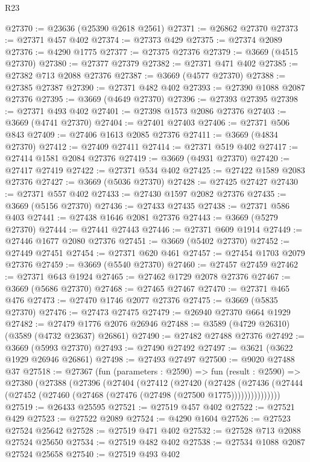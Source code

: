 \begin{lexlean}{R23}
\begin{coremodule}
@27370 := @23636 (@25390 @2618 @2561)
@27371 := @26862 @27370
@27373 := @27371 @457 @402
@27374 := @27373 @429
@27375 := @27374 @2089
@27376 := @4290 @1775
@27377 := @27375 @27376
@27379 := @3669 (@4515 @27370)
@27380 := @27377 @27379
@27382 := @27371 @471 @402
@27385 := @27382 @713 @2088 @27376
@27387 := @3669 (@4577 @27370)
@27388 := @27385 @27387
@27390 := @27371 @482 @402
@27393 := @27390 @1088 @2087 @27376
@27395 := @3669 (@4649 @27370)
@27396 := @27393 @27395
@27398 := @27371 @493 @402
@27401 := @27398 @1573 @2086 @27376
@27403 := @3669 (@4741 @27370)
@27404 := @27401 @27403
@27406 := @27371 @506 @843
@27409 := @27406 @1613 @2085 @27376
@27411 := @3669 (@4834 @27370)
@27412 := @27409 @27411
@27414 := @27371 @519 @402
@27417 := @27414 @1581 @2084 @27376
@27419 := @3669 (@4931 @27370)
@27420 := @27417 @27419
@27422 := @27371 @534 @402
@27425 := @27422 @1589 @2083 @27376
@27427 := @3669 (@5036 @27370)
@27428 := @27425 @27427
@27430 := @27371 @557 @402
@27433 := @27430 @1597 @2082 @27376
@27435 := @3669 (@5156 @27370)
@27436 := @27433 @27435
@27438 := @27371 @586 @403
@27441 := @27438 @1646 @2081 @27376
@27443 := @3669 (@5279 @27370)
@27444 := @27441 @27443
@27446 := @27371 @609 @1914
@27449 := @27446 @1677 @2080 @27376
@27451 := @3669 (@5402 @27370)
@27452 := @27449 @27451
@27454 := @27371 @620 @461
@27457 := @27454 @1703 @2079 @27376
@27459 := @3669 (@5540 @27370)
@27460 := @27457 @27459
@27462 := @27371 @643 @1924
@27465 := @27462 @1729 @2078 @27376
@27467 := @3669 (@5686 @27370)
@27468 := @27465 @27467
@27470 := @27371 @465 @476
@27473 := @27470 @1746 @2077 @27376
@27475 := @3669 (@5835 @27370)
@27476 := @27473 @27475
@27479 := @26940 @27370 @664 @1929
@27482 := @27479 @1776 @2076 @26946
@27488 := @3589 (@4729 @26310) (@3589 (@4732 @23637) @26861)
@27490 := @27482 @27488 @27376
@27492 := @3669 (@5993 @27370)
@27493 := @27490 @27492
@27497 := @3621 (@3622 @1929 @26946 @26861)
@27498 := @27493 @27497
@27500 := @9020 @27488 @37
@27518 := @27367
    (fun (parameters : @2590) =>
    fun (result : @2590) =>
    @27380
      (@27388
        (@27396
          (@27404
            (@27412
              (@27420
                (@27428
                  (@27436
                    (@27444 (@27452 (@27460 (@27468 (@27476 (@27498 (@27500 @1775)))))))))))))))
@27519 := @26433 @25595
@27521 := @27519 @457 @402
@27522 := @27521 @429
@27523 := @27522 @2089
@27524 := @4290 @1604
@27526 := @27523 @27524 @25642
@27528 := @27519 @471 @402
@27532 := @27528 @713 @2088 @27524 @25650
@27534 := @27519 @482 @402
@27538 := @27534 @1088 @2087 @27524 @25658
@27540 := @27519 @493 @402

\end{coremodule}
\end{lexlean}
